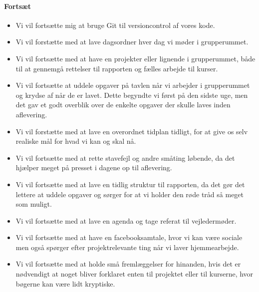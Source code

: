\documentclass[oneside,a4paper,titlepage]{article}
\begin{document}
\paragraph{Fortsæt}
\begin{itemize}
  \item Vi vil fortsætte mig at bruge Git til versioncontrol af vores kode.
  \item Vi vil forstætte med at lave dagsordner hver dag vi møder i grupperummet.
  \item Vi vil fortsætte med at have en projekter eller lignende i grupperummet, både til at gennemgå rettelser til rapporten og fælles arbejde til kurser. 
  \item Vi vil fortsætte at uddele opgaver på tavlen når vi arbejder i grupperummet og krydse af når de er lavet. Dette begyndte vi først på den sidste uge, men det gav et godt overblik over de enkelte opgaver der skulle laves inden aflevering.
  \item Vi vil forstætte med at lave en overordnet tidplan tidligt, for at give os selv realiske mål for hvad vi kan og skal nå.
  \item Vi vil fortsætte med at rette stavefejl og andre småting løbende, da det hjælper meget på presset i dagene op til aflevering. 
  \item Vi vil fortsætte med at lave en tidlig struktur til rapporten, da det gør det lettere at uddele opgaver og sørger for at vi holder den røde tråd så meget som muligt. 
  \item Vi vil fortsætte med at lave en agenda og tage referat til vejledermøder.
  \item Vi vil fortsætte med at have en facebooksamtale, hvor vi kan være sociale men også spørger efter projektrelevante ting når vi laver hjemmearbejde.
  \item Vi vil fortsætte med at holde små fremlæggelser for hinanden, hvis det er nødvendigt at noget bliver forklaret enten til projektet eller til kurserne, hvor bøgerne kan være lidt kryptiske. 
  
\end{itemize}


\end{document}
